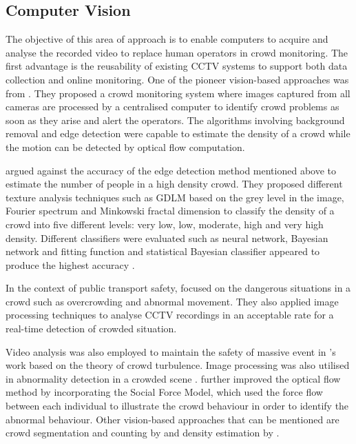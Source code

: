 \subsection{Computer Vision}
The objective of this area of approach is to enable computers to acquire and analyse the recorded video to replace human operators in crowd monitoring. The first advantage is the reusability of existing CCTV systems to support both data collection and online monitoring. One of the pioneer vision-based approaches was from \textcite{Davies1995}. They proposed a crowd monitoring system where images captured from all cameras are processed by a centralised computer to identify crowd problems as soon as they arise and alert the operators. The algorithms involving background removal and edge detection were capable to estimate the density of a crowd while the motion can be detected by optical flow computation.

\textcite{Marana1997} argued against the accuracy of the edge detection method mentioned above to estimate the number of people in a high density crowd. They proposed different texture analysis techniques such as GDLM based on the grey level in the image, Fourier spectrum and Minkowski fractal dimension \parencite{Marana1999} to classify the density of a crowd into five different levels: very low, low, moderate, high and very high density. Different classifiers were evaluated such as neural network, Bayesian network and fitting function and statistical Bayesian classifier appeared to produce the highest accuracy \parencite{Marana1998}.

In the context of public transport safety, \textcite{Velastin1999} focused on the dangerous situations in a crowd such as overcrowding and abnormal movement. They also applied image processing techniques to analyse CCTV recordings in an acceptable rate for a real-time detection of crowded situation.

Video analysis was also employed to maintain the safety of massive event in \textcite{Johansson2008}’s work based on the theory of crowd turbulence. Image processing was also utilised in abnormality detection in a crowded scene \parencite{Mahadevan2010, Mehran2009}. \textcite{Mehran2009} further improved the optical flow method by incorporating the Social Force Model, which used the force flow between each individual to illustrate the crowd behaviour in order to identify the abnormal behaviour. Other vision-based approaches that can be mentioned are crowd segmentation and counting by \textcite{Chan2008} and density estimation by \textcite{Li2010}.

